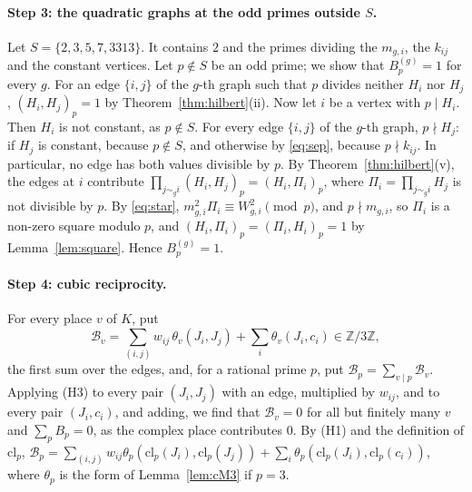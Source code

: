 \documentclass[11pt]{article}
\newcommand{\Z}{\mathbb{Z}}
\begin{document}
\paragraph{Step 3: the quadratic graphs at the odd primes outside $S$.} Let $S=\{2,\allowbreak 3,\allowbreak 5,\allowbreak 7,\allowbreak 3313\}$. It contains $2$ and the primes dividing the $m_{g,i}$, the $k_{ij}$ and the constant vertices. Let $p\notin S$ be an odd prime; we show that $B^{(g)}_p=1$ for every $g$. For an edge $\{i,j\}$ of the $g$-th graph such that $p$ divides neither $H_i$ nor $H_j$, $(H_i,H_j)_p=1$ by Theorem~\ref{thm:hilbert}(ii). Now let $i$ be a vertex with $p\mid H_i$. Then $H_i$ is not constant, as $p\notin S$. For every edge $\{i,j\}$ of the $g$-th graph, $p\nmid H_j$: if $H_j$ is constant, because $p\notin S$, and otherwise by \eqref{eq:sep}, because $p\nmid k_{ij}$. In particular, no edge has both values divisible by $p$. By Theorem~\ref{thm:hilbert}(v), the edges at $i$ contribute $\prod_{j\sim_g i}(H_i,H_j)_p=(H_i,\Pi_i)_p$, where $\Pi_i=\prod_{j\sim_g i}H_j$ is not divisible by $p$. By \eqref{eq:star}, $m_{g,i}^2\Pi_i\equiv W_{g,i}^2\pmod p$, and $p\nmid m_{g,i}$, so $\Pi_i$ is a non-zero square modulo $p$, and $(H_i,\Pi_i)_p=(\Pi_i,H_i)_p=1$ by Lemma~\ref{lem:square}. Hence $B^{(g)}_p=1$.

\paragraph{Step 4: cubic reciprocity.} For every place $v$ of $K$, put
\begin{equation}\label{eq:cB}
\mathcal B_v=\sum_{(i,j)}w_{ij}\,\theta_v(J_i,J_j)+\sum_i\theta_v(J_i,c_i)\in\Z/3\Z,
\end{equation}
the first sum over the edges, and, for a rational prime $p$, put $\mathcal B_p=\sum_{v\mid p}\mathcal B_v$. Applying (H3) to every pair $(J_i,J_j)$ with an edge, multiplied by $w_{ij}$, and to every pair $(J_i,c_i)$, and adding, we find that $\mathcal B_v=0$ for all but finitely many $v$ and $\sum_pB_p=0$, as the complex place contributes $0$. By (H1) and the definition of $\mathrm{cl}_p$, $\mathcal B_p=\sum_{(i,j)}w_{ij}\theta_p(\mathrm{cl}_p(J_i),\mathrm{cl}_p(J_j))+\sum_i\theta_p(\mathrm{cl}_p(J_i),\mathrm{cl}_p(c_i))$, where $\theta_p$ is the form of Lemma~\ref{lem:cM3} if $p=3$.
\end{document}

